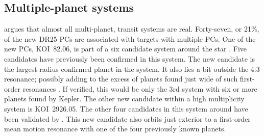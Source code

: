 \subsection{Multiple-planet systems}
\citet{Lissauer2014} argues that almost all multi-planet, transit systems are real. Forty-seven, or 21\%, of the new DR25 PCs are associated with targets with multiple PCs. One of the new PCs, KOI~82.06, is part of a six candidate system around the star . Five candidates have previously been confirmed \citep{Marcy2014,Rowe2014} in this system. The new candidate is the largest radius confirmed planet in the system. It also lies a bit outside the 4:3 resonance; possibly adding to the excess of planets found just wide of such first-order resonances \citep{Lissauer2011}. If verified, this would be only the 3rd system with six or more planets found by Kepler. 
The other new candidate within a high multiplicity system is KOI~2926.05. The other four candidates in this system around  have been validated by \citet{Morton2016}. This new candidate also orbits just exterior to a first-order mean motion resonance with one of the four previously known planets.


